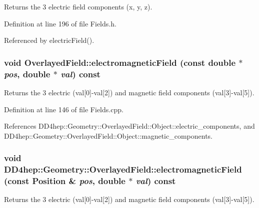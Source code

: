 Returns the 3 electric field components (x, y, z). 

Definition at line 196 of file Fields.h.

Referenced by electricField().\hypertarget{class_d_d4hep_1_1_geometry_1_1_overlayed_field_a4be1f82d78ddb39722af11c407be7266}{
\subsubsection[{electromagneticField}]{\setlength{\rightskip}{0pt plus 5cm}void OverlayedField::electromagneticField (const double $\ast$ {\em pos}, \/  double $\ast$ {\em val}) const}}
\label{class_d_d4hep_1_1_geometry_1_1_overlayed_field_a4be1f82d78ddb39722af11c407be7266}


Returns the 3 electric (val\mbox{[}0\mbox{]}-\/val\mbox{[}2\mbox{]}) and magnetic field components (val\mbox{[}3\mbox{]}-\/val\mbox{[}5\mbox{]}). 

Definition at line 146 of file Fields.cpp.

References DD4hep::Geometry::OverlayedField::Object::electric\_\-components, and DD4hep::Geometry::OverlayedField::Object::magnetic\_\-components.\hypertarget{class_d_d4hep_1_1_geometry_1_1_overlayed_field_ae3937e0cc788e234ee2b96182eeeeb60}{
\subsubsection[{electromagneticField}]{\setlength{\rightskip}{0pt plus 5cm}void DD4hep::Geometry::OverlayedField::electromagneticField (const {\bf Position} \& {\em pos}, \/  double $\ast$ {\em val}) const}}
\label{class_d_d4hep_1_1_geometry_1_1_overlayed_field_ae3937e0cc788e234ee2b96182eeeeb60}


Returns the 3 electric (val\mbox{[}0\mbox{]}-\/val\mbox{[}2\mbox{]}) and magnetic field components (val\mbox{[}3\mbox{]}-\/val\mbox{[}5\mbox{]}). 

